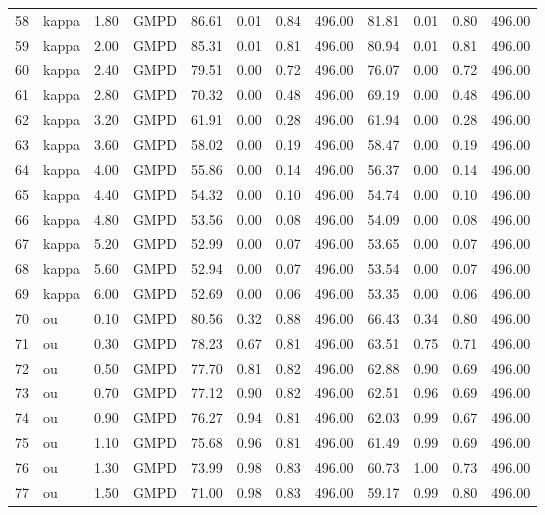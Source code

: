 \begin{table}[ht]
\begin{tabular}{rlrlrrrrrrrr}
  58 & kappa & 1.80 & GMPD & 86.61 & 0.01 & 0.84 & 496.00 & 81.81 & 0.01 & 0.80 & 496.00 \\ 
  59 & kappa & 2.00 & GMPD & 85.31 & 0.01 & 0.81 & 496.00 & 80.94 & 0.01 & 0.81 & 496.00 \\ 
  60 & kappa & 2.40 & GMPD & 79.51 & 0.00 & 0.72 & 496.00 & 76.07 & 0.00 & 0.72 & 496.00 \\ 
  61 & kappa & 2.80 & GMPD & 70.32 & 0.00 & 0.48 & 496.00 & 69.19 & 0.00 & 0.48 & 496.00 \\ 
  62 & kappa & 3.20 & GMPD & 61.91 & 0.00 & 0.28 & 496.00 & 61.94 & 0.00 & 0.28 & 496.00 \\ 
  63 & kappa & 3.60 & GMPD & 58.02 & 0.00 & 0.19 & 496.00 & 58.47 & 0.00 & 0.19 & 496.00 \\ 
  64 & kappa & 4.00 & GMPD & 55.86 & 0.00 & 0.14 & 496.00 & 56.37 & 0.00 & 0.14 & 496.00 \\ 
  65 & kappa & 4.40 & GMPD & 54.32 & 0.00 & 0.10 & 496.00 & 54.74 & 0.00 & 0.10 & 496.00 \\ 
  66 & kappa & 4.80 & GMPD & 53.56 & 0.00 & 0.08 & 496.00 & 54.09 & 0.00 & 0.08 & 496.00 \\ 
  67 & kappa & 5.20 & GMPD & 52.99 & 0.00 & 0.07 & 496.00 & 53.65 & 0.00 & 0.07 & 496.00 \\ 
  68 & kappa & 5.60 & GMPD & 52.94 & 0.00 & 0.07 & 496.00 & 53.54 & 0.00 & 0.07 & 496.00 \\ 
  69 & kappa & 6.00 & GMPD & 52.69 & 0.00 & 0.06 & 496.00 & 53.35 & 0.00 & 0.06 & 496.00 \\ 
  70 & ou & 0.10 & GMPD & 80.56 & 0.32 & 0.88 & 496.00 & 66.43 & 0.34 & 0.80 & 496.00 \\ 
  71 & ou & 0.30 & GMPD & 78.23 & 0.67 & 0.81 & 496.00 & 63.51 & 0.75 & 0.71 & 496.00 \\ 
  72 & ou & 0.50 & GMPD & 77.70 & 0.81 & 0.82 & 496.00 & 62.88 & 0.90 & 0.69 & 496.00 \\ 
  73 & ou & 0.70 & GMPD & 77.12 & 0.90 & 0.82 & 496.00 & 62.51 & 0.96 & 0.69 & 496.00 \\ 
  74 & ou & 0.90 & GMPD & 76.27 & 0.94 & 0.81 & 496.00 & 62.03 & 0.99 & 0.67 & 496.00 \\ 
  75 & ou & 1.10 & GMPD & 75.68 & 0.96 & 0.81 & 496.00 & 61.49 & 0.99 & 0.69 & 496.00 \\ 
  76 & ou & 1.30 & GMPD & 73.99 & 0.98 & 0.83 & 496.00 & 60.73 & 1.00 & 0.73 & 496.00 \\ 
  77 & ou & 1.50 & GMPD & 71.00 & 0.98 & 0.83 & 496.00 & 59.17 & 0.99 & 0.80 & 496.00 \\ 

\end{tabular}
\end{table}
